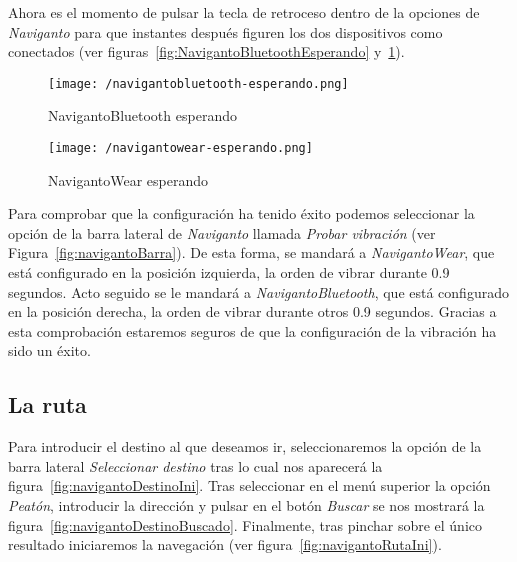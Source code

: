 Ahora es el momento de pulsar la tecla de retroceso dentro de la opciones de \emph{Naviganto} para
que instantes después figuren los dos dispositivos como conectados (ver
figuras~\ref{fig:NavigantoBluetoothEsperando} y~\ref{fig:NavigantowearEsperando}).

\begin{figure}[!h]
  \begin{minipage}[b]{0.5\linewidth}
    \begin{center}
      \texttt{[image: /navigantobluetooth-esperando.png]}
      \caption{NavigantoBluetooth esperando}
      \label{fig:NavigantoBluetoothEsperando}
    \end{center}
  \end{minipage}
  \begin{minipage}[b]{0.5\linewidth}
    \begin{center}
      \texttt{[image: /navigantowear-esperando.png]}
      \caption{NavigantoWear esperando}
      \label{fig:NavigantowearEsperando}
    \end{center}
  \end{minipage}
\end{figure}

Para comprobar que la configuración ha tenido éxito podemos seleccionar la opción de la barra
lateral de \emph{Naviganto} llamada \emph{Probar vibración} (ver
Figura~\ref{fig:navigantoBarra}). De esta forma, se mandará a \emph{NavigantoWear}, que está
configurado en la posición izquierda, la orden de vibrar durante 0.9 segundos. Acto seguido se le
mandará a \emph{NavigantoBluetooth}, que está configurado en la posición derecha, la orden de vibrar
durante otros 0.9 segundos. Gracias a esta comprobación estaremos seguros de que la configuración de
la vibración ha sido un éxito.

\subsection{La ruta}

Para introducir el destino al que deseamos ir, seleccionaremos la opción de la barra lateral
\emph{Seleccionar destino} tras lo cual nos aparecerá la figura~\ref{fig:navigantoDestinoIni}. Tras
seleccionar en el menú superior la opción \emph{Peatón}, introducir la dirección y pulsar en el
botón \emph{Buscar} se nos mostrará la figura~\ref{fig:navigantoDestinoBuscado}. Finalmente, tras
pinchar sobre el único resultado iniciaremos la navegación (ver figura~\ref{fig:navigantoRutaIni}).

